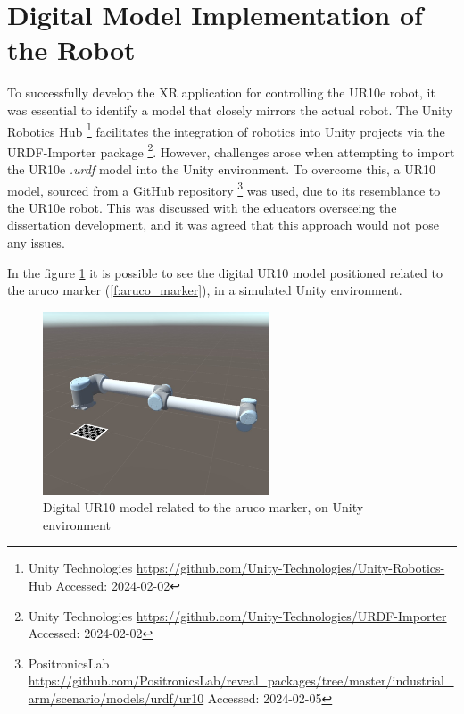 \section{Digital Model Implementation of the Robot}
\label{section:digital-model}

    To successfully develop the XR application for controlling the UR10e robot, it was essential to identify a model that closely mirrors 
    the actual robot. The Unity Robotics Hub \footnote{Unity Technologies \url{https://github.com/Unity-Technologies/Unity-Robotics-Hub} 
    Accessed: 2024-02-02} facilitates the integration of robotics into Unity projects via the URDF-Importer package 
    \footnote{Unity Technologies \url{https://github.com/Unity-Technologies/URDF-Importer} Accessed: 2024-02-02}. 
    However, challenges arose when attempting to import the UR10e \textit{.urdf} model into the Unity environment. To overcome this, 
    a UR10 model, sourced from a GitHub repository \footnote{PositronicsLab \url{https://github.com/PositronicsLab/reveal_packages/tree/master/industrial_arm/scenario/models/urdf/ur10} Accessed: 2024-02-05} 
    was used, due to its resemblance to the UR10e robot. This was discussed with the educators overseeing the dissertation development, 
    and it was agreed that this approach would not pose any issues.

    In the figure \ref{f:ur10_marker_unity} it is possible to see the digital UR10 model positioned related to the aruco marker 
    (\ref{f:aruco_marker}), in a simulated Unity environment.
    \begin{figure}[h]
    \centering
    \includegraphics[width=0.6\textwidth]{figs/robot_marker_unity.jpg}
    \caption{Digital UR10 model related to the aruco marker, on Unity environment}
    \label{f:ur10_marker_unity}
    \end{figure}

